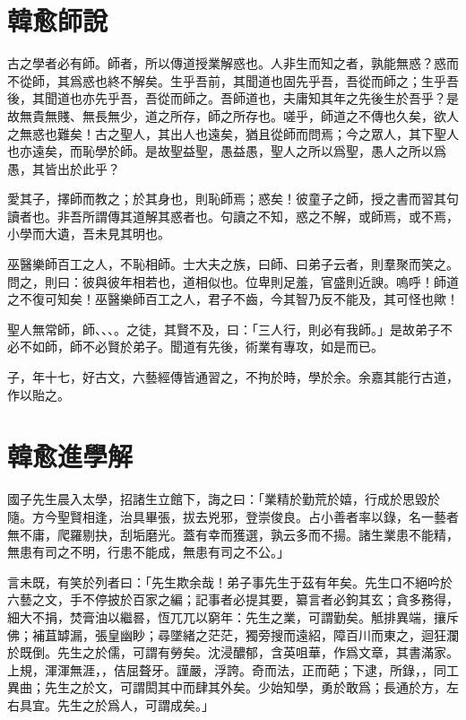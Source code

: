 
\section[師說\quad{\small 韓愈}]{{\normalsize 韓愈}\quad 師說}
古之學者必有師。師者，所以傳道授業解惑也。人非生而知之者，孰能無惑？惑而不從師，其爲惑也終不解矣。生乎吾前，其聞道也固先乎吾，吾從而師之；生乎吾後，其聞道也亦先乎吾，吾從而師之。吾師道也，夫庸知其年之先後生於吾乎？是故無貴無賤、無長無少，道之所存，師之所存也。嗟乎，師道之不傳也久矣，欲人之無惑也難矣！古之聖人，其出人也遠矣，猶且從師而問焉；今之眾人，其下聖人也亦遠矣，而恥學於師。是故聖益聖，愚益愚，聖人之所以爲聖，愚人之所以爲愚，其皆出於此乎？

愛其子，擇師而教之；於其身也，則恥師焉；惑矣！彼童子之師，授之書而習其句讀者也。非吾所謂傳其道解其惑者也。句讀之不知，惑之不解，或師焉，或不焉，小學而大遺，吾未見其明也。

巫醫樂師百工之人，不恥相師。士大夫之族，曰師、曰弟子云者，則羣聚而笑之。問之，則曰：彼與彼年相若也，道相似也。位卑則足羞，官盛則近諛。嗚呼！師道之不復可知矣！巫醫樂師百工之人，君子不齒，今其智乃反不能及，其可怪也歟！

聖人無常師，師、、、。之徒，其賢不及，曰：「三人行，則必有我師。」是故弟子不必不如師，師不必賢於弟子。聞道有先後，術業有專攻，如是而已。

子，年十七，好古文，六藝經傳皆通習之，不拘於時，學於余。余嘉其能行古道，作以貽之。

\section[進學解\quad{\small 韓愈}]{{\normalsize 韓愈}\quad 進學解}
國子先生晨入太學，招諸生立館下，誨之曰：「業精於勤荒於嬉，行成於思毀於隨。方今聖賢相逢，治具畢張，拔去兇邪，登崇俊良。占小善者率以錄，名一藝者無不庸，爬羅剔抉，刮垢磨光。蓋有幸而獲選，孰云多而不揚。諸生業患不能精，無患有司之不明，行患不能成，無患有司之不公。」

言未既，有笑於列者曰：「先生欺余哉！弟子事先生于茲有年矣。先生口不絕吟於六藝之文，手不停披於百家之編；記事者必提其要，纂言者必鉤其玄；貪多務得，細大不捐，焚膏油以繼晷，恆兀兀以窮年：先生之業，可謂勤矣。觝排異端，攘斥佛；補苴罅漏，張皇幽眇；尋墜緒之茫茫，獨旁搜而遠紹，障百川而東之，迴狂瀾於既倒。先生之於儒，可謂有勞矣。沈浸醲郁，含英咀華，作爲文章，其書滿家。上規，渾渾無涯，，佶屈聱牙。謹嚴，浮誇。奇而法，正而葩；下逮，所錄，，同工異曲；先生之於文，可謂閎其中而肆其外矣。少始知學，勇於敢爲；長通於方，左右具宜。先生之於爲人，可謂成矣。」

